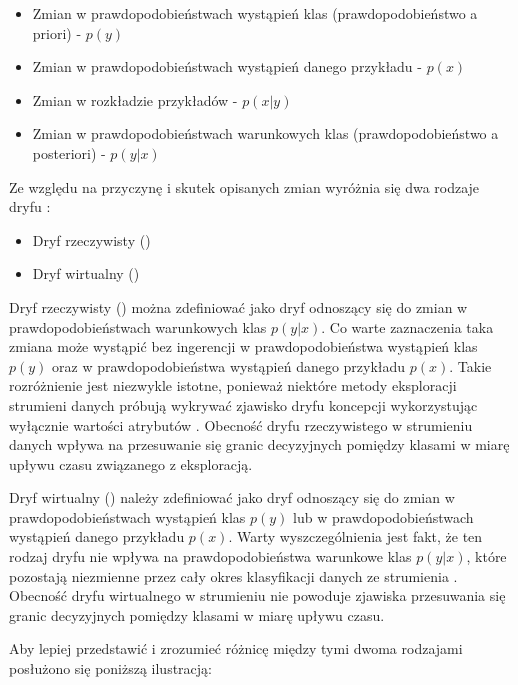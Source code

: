 \begin{itemize}
    \item Zmian w prawdopodobieństwach wystąpień klas (prawdopodobieństwo a priori) - $p(y)$
    \item Zmian w prawdopodobieństwach wystąpień danego przykładu - $p(x)$
    \item Zmian w rozkładzie przykładów - $p(x|y)$
    \item Zmian w prawdopodobieństwach warunkowych klas (prawdopodobieństwo a posteriori) - $p(y|x)$
\end{itemize}

\noindent Ze względu na przyczynę i skutek opisanych zmian wyróżnia się dwa rodzaje dryfu \cite{Article:DriftGama2}:

\begin{itemize}
    \item Dryf rzeczywisty ()
    \item Dryf wirtualny ()
\end{itemize}

\noindent Dryf rzeczywisty () można zdefiniować jako dryf odnoszący się do zmian w prawdopodobieństwach warunkowych klas $p(y|x)$. Co warte zaznaczenia taka zmiana może wystąpić bez ingerencji w prawdopodobieństwa wystąpień klas $p(y)$ oraz w prawdopodobieństwa wystąpień danego przykładu $p(x)$. Takie rozróżnienie jest niezwykle istotne, ponieważ niektóre metody eksploracji strumieni danych próbują wykrywać zjawisko dryfu koncepcji wykorzystując wyłącznie wartości atrybutów \cite{Article:RealDrift}. Obecność dryfu rzeczywistego w strumieniu danych wpływa na przesuwanie się granic decyzyjnych pomiędzy klasami w miarę upływu czasu związanego z eksploracją.

Dryf wirtualny () należy zdefiniować jako dryf odnoszący się do zmian w prawdopodobieństwach wystąpień klas $p(y)$ lub w prawdopodobieństwach wystąpień danego przykładu $p(x)$. Warty wyszczególnienia jest fakt, że ten rodzaj dryfu nie wpływa na prawdopodobieństwa warunkowe klas $p(y|x)$, które pozostają niezmienne przez cały okres klasyfikacji danych ze strumienia \cite{Article:VirtualDrift}. Obecność dryfu wirtualnego w strumieniu nie powoduje zjawiska przesuwania się granic decyzyjnych pomiędzy klasami w miarę upływu czasu.

\newpage

Aby lepiej przedstawić i zrozumieć różnicę między tymi dwoma rodzajami posłużono się poniższą ilustracją:

